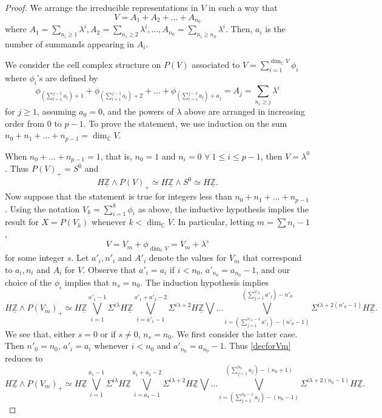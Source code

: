 \documentclass[a4paper,leqno,11pt]{amsart}
\theoremstyle{plain}
\theoremstyle{definition}
\theoremstyle{remark}
\theoremstyle{definition}
\newcommand{\C}{{\mathbb C}}
\newenvironment{myeq}[1][]
{\stepcounter{theorem}\begin{equation}\tag{\thetheorem}{#1}}
	{\end{equation}}
\newcommand{\uZ}{\underline{\mathbb{Z}}}
\def\lam{\lambda}
\def\C{\mathbb{C}}
\numberwithin{equation}{section}
\newcommand{\smas}{\wedge}
\begin{document}
	\begin{proof}
		We arrange the irreducible representations in $V$ in such a way  that 
		$$V = A_1 + A_2 + \dots + A_{n_0}$$
		where $A_1 = \sum_{n_i \geq 1} \lambda^i, A_2 = \sum_{n_i\geq 2}\lambda^i, \dots , A_{n_0} = \sum_{n_i\geq n_0}\lambda^i$. Then, $a_i$ is the number of summands appearing in $A_i$.
		
		We consider the cell complex structure on $P(V)$ associated to $V=\sum_{i=1}^{\dim_{\C}V}\phi_i$ where $\phi_i$'s are defined by 
		$$\phi_{(\sum_{l=1}^{j-1} a_{l}) +1}+\phi_{(\sum_{l=1}^{j-1} a_{l})+2}+ \dots + \phi_{(\sum_{l=1}^{j-1} a_{l}) + a_{j}} = A_{j} = \sum_{n_i\geq j}\lambda^i $$
		for $j\geq 1$, assuming $a_{0}=0 $, and the powers of $\lam$ above are arranged in increasing order from $0$ to $p-1$.
		To prove the statement, we use induction on the sum $n_0 + n_1 +\dots + n_{p-1} = \dim_{\C}V$. 
		
		When $n_0 + \dots + n_{p-1}=1$, that is, $n_0 = 1$ and $n_i=0 $ $ \forall~ 1\leq i \leq p-1$, then $V= \lambda^0$. Thus $P(V)_+ = S^0$ and 
		$$H\uZ\smas P(V)_+ \simeq H\uZ\smas S^0 \simeq H\uZ.$$
		Now suppose that the statement is true for integers less than $n_0 + n_1 + \dots + n_{p-1}$. Using the notation $V_k =\sum _{i=1}^k\phi_{i} $ as above, the inductive hypothesis implies the result for $X=P(V_k)$  whenever $k < \dim_{\C}V$. In particular, letting $m=\sum n_i - 1$,
		$$V=V_m + \phi_{\dim_{\C}V} = V_m + \lambda^s $$
		for some integer $s$. Let $a'_{i}, n'_{i}$ and $A'_{i}$ denote the values for $V_m$ that correspond to $a_{i}, n_{i}$ and $A_{i}$ for $V$. Observe that $a'_{i} = a_{i}$ if $i<n_0$, $a'_{n_{0}} = a_{n_{0}} - 1$, and our choice of the $\phi_{i}$ implies that $n_{s} = n_{0}$. The induction hypothesis implies 
		\begin{myeq}\label{decforVm}
			{H\uZ\smas P(V_m)_+ \simeq H\uZ\bigvee_{i=1}^{a'_1-1}\Sigma^{i\lambda} H\uZ\bigvee_{i=a'_1-1}^{a'_1+a'_2-2} \Sigma^{i\lambda+2}H\uZ\bigvee \dots \bigvee_{i=(\sum_{j=1}^{n'_0-1}a'_{j})-(n'_0-1)}^{(\sum_{j=1}^{n'_0}a'_{j})- n'_0 } \Sigma^{i\lambda + 2(n'_0-1)}H\uZ}.
		\end{myeq}
		We see that, either $s=0$ or if $s\neq 0$, $n_{s}=n_{0}$. We first consider the latter case. Then $n'_0 = n_0$, $a'_i=a_i$ whenever $i< n_0$ and $a'_{n_0}= a_{n_0}-1$. Thus \eqref{decforVm} reduces to 
		$$H\uZ\smas P(V_m)_+ \simeq H\uZ\bigvee_{i=1}^{a_1-1}\Sigma^{i\lambda} H\uZ\bigvee_{i=a_1-1}^{a_1+a_2-2} \Sigma^{i\lambda+2}H\uZ\bigvee \dots \bigvee_{i=(\sum_{j=1}^{n_0-1}a_{j})-(n_0-1)}^{(\sum_{j=1}^{n_0}a_{j})-( n_0 +1) } \Sigma^{i\lambda + 2(n_0-1)}H\uZ.$$
		

\end{proof}
\end{document}
